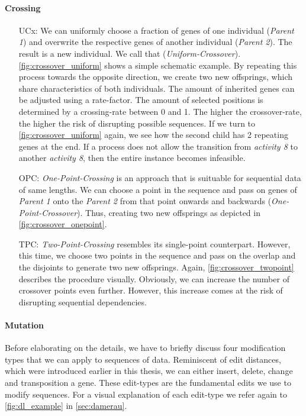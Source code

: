 \documentclass[./../../paper.tex]{subfiles}
\begin{document}
\paragraph{Crossing}
\begin{enumerate}
    \item[UCx:] We can uniformly choose a fraction of genes of one individual (\emph{Parent 1}) and overwrite the respective genes of another individual (\emph{Parent 2}). The result is a new individual. We call that (\emph{Uniform-Crossover}).
          \autoref{fig:crossover_uniform} shows a simple schematic example. By repeating this process towards the opposite direction, we create two new offsprings, which share characteristics of both individuals.
          The amount of inherited genes can be adjusted using a rate-factor. The amount of selected positions is determined by a crossing-rate between 0 and 1. The higher the crossover-rate, the higher the risk of disrupting possible sequences. If we turn to \autoref{fig:crossover_uniform} again, we see how the second child has 2 repeating genes at the end. If a process does not allow the transition from \emph{activity 8} to another \emph{activity 8}, then the entire \gls{instance} becomes infeasible.
    \item[OPC:] \emph{One-Point-Crossing} is an approach that is suituable for sequential data of same lengths. We can choose a point in the sequence and pass on genes of \emph{Parent 1} onto the \emph{Parent 2} from that point onwards and backwards (\emph{One-Point-Crossover}).
          Thus, creating two new offsprings as depicted in \autoref{fig:crossover_onepoint}.
    \item[TPC:] \emph{Two-Point-Crossing} resembles its single-point counterpart. However, this time, we choose two points in the sequence and pass on the overlap and the disjoints to generate two new offsprings. Again, \autoref{fig:crossover_twopoint} describes the procedure visually. Obviously, we can increase the number of crossover points even further. However, this increase comes at the risk of disrupting sequential dependencies.
\end{enumerate}







\paragraph{Mutation}
Before elaborating on the details, we have to briefly discuss four modification types that we can apply to sequences of data. Reminiscent of edit distances, which were introduced earlier in this thesis, we can either insert, delete, change and transposition a gene. These edit-types are the fundamental edits we use to modify sequences. For a visual explanation of each edit-type we refer again to \autoref{fig:dl_example} in \autoref{sec:damerau}.
\end{document}
